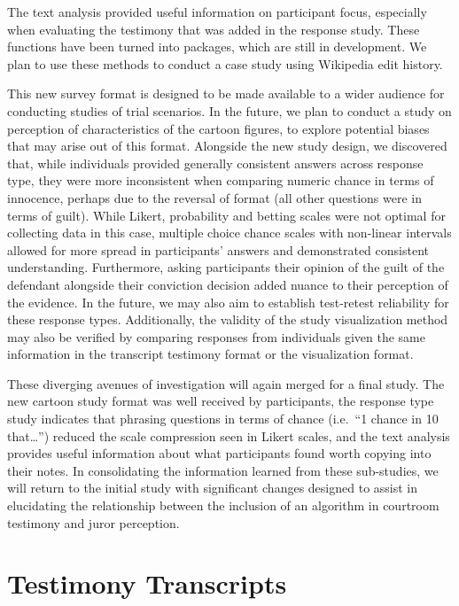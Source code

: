 \documentclass[print]{nuthesis}
\begin{document}
The text analysis provided useful information on participant focus, especially when evaluating the testimony that was added in the response study.
These functions have been turned into packages, which are still in development.
We plan to use these methods to conduct a case study using Wikipedia edit history.

This new survey format is designed to be made available to a wider audience for conducting studies of trial scenarios.
In the future, we plan to conduct a study on perception of characteristics of the cartoon figures, to explore potential biases that may arise out of this format.
Alongside the new study design, we discovered that, while individuals provided generally consistent answers across response type, they were more inconsistent when comparing numeric chance in terms of innocence, perhaps due to the reversal of format (all other questions were in terms of guilt).
While Likert, probability and betting scales were not optimal for collecting data in this case, multiple choice chance scales with non-linear intervals allowed for more spread in participants' answers and demonstrated consistent understanding.
Furthermore, asking participants their opinion of the guilt of the defendant alongside their conviction decision added nuance to their perception of the evidence.
In the future, we may also aim to establish test-retest reliability for these response types.
Additionally, the validity of the study visualization method may also be verified by comparing responses from individuals given the same information in the transcript testimony format or the visualization format.

These diverging avenues of investigation will again merged for a final study.
The new cartoon study format was well received by participants, the response type study indicates that phrasing questions in terms of chance (i.e.~``1 chance in 10 that\ldots{}'') reduced the scale compression seen in Likert scales, and the text analysis provides useful information about what participants found worth copying into their notes.
In consolidating the information learned from these sub-studies, we will return to the initial study with significant changes designed to assist in elucidating the relationship between the inclusion of an algorithm in courtroom testimony and juror perception.

\appendix

\hypertarget{testimony-transcripts}{%
\chapter{Testimony Transcripts}\label{testimony-transcripts}}
\end{document}

